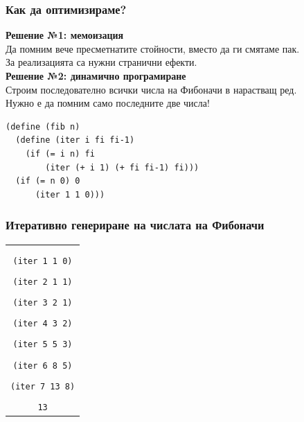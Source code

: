 \documentclass{beamer}
\begin{document}
\begin{frame}[fragile]
  \frametitle{Как да оптимизираме?}

  \textbf{Решение №1: мемоизация}\\
  Да помним вече пресметнатите стойности, вместо да ги смятаме пак.\\
  \pause
  \alert{За реализацията са нужни странични ефекти.}\\[1em]
  \pause
  \textbf{Решение №2: динамично програмиране}\\
  Строим последователно всички числа на Фибоначи в нарастващ ред.\\
  \pause
  \alert{Нужно е да помним само последните две числа!}\\
  \pause
\begin{lstlisting}
(define (fib n)
  (define (iter i fi fi-1)
    (if (= i n) fi
        (iter (+ i 1) (+ fi fi-1) fi)))
  (if (= n 0) 0
      (iter 1 1 0)))
\end{lstlisting}
\end{frame}

\begin{frame}
  \frametitle{Итеративно генериране на числата на Фибоначи}

  \small
  \begin{center}
    \begin{tabular}{c}
      \nxt{\tt{(fib 7)}\\
      \nxt{\bda\\
      \tt{(iter 1 1 0)}\\
      \nxt{\bda\\
      \tt{(iter 2 1 1)}\\
      \nxt{\bda\\
      \tt{(iter 3 2 1)}\\
      \nxt{\bda\\
      \tt{(iter 4 3 2)}\\
      \nxt{\bda\\
      \tt{(iter 5 5 3)}\\
      \nxt{\bda\\
      \tt{(iter 6 8 5)}\\
      \nxt{\bda\\
      \tt{(iter 7 13 8)}\\
      \nxt{\bda\\
      \tt{13}}}}}}}}}}
    \end{tabular}
  \end{center}
\end{frame}
\end{document}
